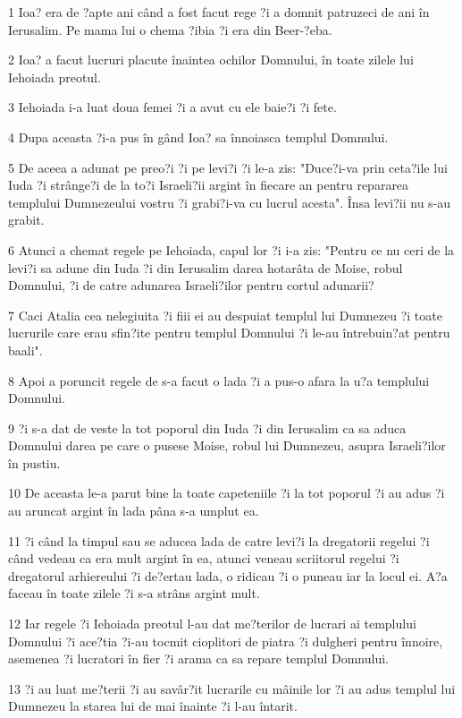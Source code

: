 \par 1 Ioa? era de ?apte ani când a fost facut rege ?i a domnit patruzeci de ani în Ierusalim. Pe mama lui o chema ?ibia ?i era din Beer-?eba.
\par 2 Ioa? a facut lucruri placute înaintea ochilor Domnului, în toate zilele lui Iehoiada preotul.
\par 3 Iehoiada i-a luat doua femei ?i a avut cu ele baie?i ?i fete.
\par 4 Dupa aceasta ?i-a pus în gând Ioa? sa înnoiasca templul Domnului.
\par 5 De aceea a adunat pe preo?i ?i pe levi?i ?i le-a zis: "Duce?i-va prin ceta?ile lui Iuda ?i strânge?i de la to?i Israeli?ii argint în fiecare an pentru repararea templului Dumnezeului vostru ?i grabi?i-va cu lucrul acesta". Însa levi?ii nu s-au grabit.
\par 6 Atunci a chemat regele pe Iehoiada, capul lor ?i i-a zis: "Pentru ce nu ceri de la levi?i sa adune din Iuda ?i din Ierusalim darea hotarâta de Moise, robul Domnului, ?i de catre adunarea Israeli?ilor pentru cortul adunarii?
\par 7 Caci Atalia cea nelegiuita ?i fiii ei au despuiat templul lui Dumnezeu ?i toate lucrurile care erau sfin?ite pentru templul Domnului ?i le-au întrebuin?at pentru baali".
\par 8 Apoi a poruncit regele de s-a facut o lada ?i a pus-o afara la u?a templului Domnului.
\par 9 ?i s-a dat de veste la tot poporul din Iuda ?i din Ierusalim ca sa aduca Domnului darea pe care o pusese Moise, robul lui Dumnezeu, asupra Israeli?ilor în pustiu.
\par 10 De aceasta le-a parut bine la toate capeteniile ?i la tot poporul ?i au adus ?i au aruncat argint în lada pâna s-a umplut ea.
\par 11 ?i când la timpul sau se aducea lada de catre levi?i la dregatorii regelui ?i când vedeau ca era mult argint în ea, atunci veneau scriitorul regelui ?i dregatorul arhiereului ?i de?ertau lada, o ridicau ?i o puneau iar la locul ei. A?a faceau în toate zilele ?i s-a strâns argint mult.
\par 12 Iar regele ?i Iehoiada preotul l-au dat me?terilor de lucrari ai templului Domnului ?i ace?tia ?i-au tocmit cioplitori de piatra ?i dulgheri pentru înnoire, asemenea ?i lucratori în fier ?i arama ca sa repare templul Domnului.
\par 13 ?i au luat me?terii ?i au savâr?it lucrarile cu mâinile lor ?i au adus templul lui Dumnezeu la starea lui de mai înainte ?i l-au întarit.
